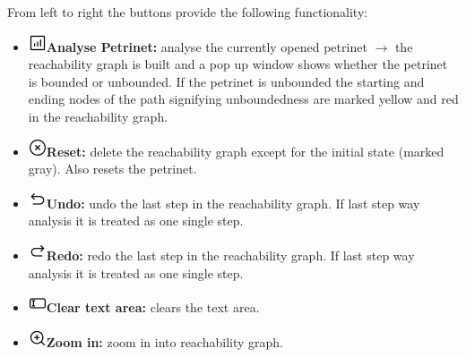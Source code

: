 \documentclass[10pt, a4paper]{article}
\begin{document}
From left to right the buttons provide the following functionality:
\begin{itemize}
\item\includegraphics[scale=0.4]{../src/resources/images/Toolbar/stats.png}\hspace{0.1cm}\textbf{Analyse Petrinet:} analyse the currently opened petrinet $\rightarrow$ the reachability graph is built and a pop up window shows whether the petrinet is bounded or unbounded. If the petrinet is unbounded the starting and ending nodes of the path signifying unboundedness are marked yellow and red in the reachability graph. 
\item\includegraphics[scale=0.4]{../src/resources/images/Toolbar/delete.png}\hspace{0.1cm}\textbf{Reset:} delete the reachability graph except for the initial state (marked gray). Also resets the petrinet. 
\item\includegraphics[scale=0.4]{../src/resources/images/Toolbar/undo.png}\hspace{0.1cm}\textbf{Undo:} undo the last step in the reachability graph. If last step way analysis it is treated as one single step.
\item\includegraphics[scale=0.4]{../src/resources/images/Toolbar/redo.png}\hspace{0.1cm}\textbf{Redo:} redo the last step in the reachability graph. If last step way analysis it is treated as one single step.
\item\includegraphics[scale=0.4]{../src/resources/images/Toolbar/input.png}\hspace{0.1cm}\textbf{Clear text area:} clears the text area.
\item\includegraphics[scale=0.4]{../src/resources/images/Toolbar/zoom-in.png}\hspace{0.1cm}\textbf{Zoom in:} zoom in into reachability graph.

\end{itemize}
\end{document}
